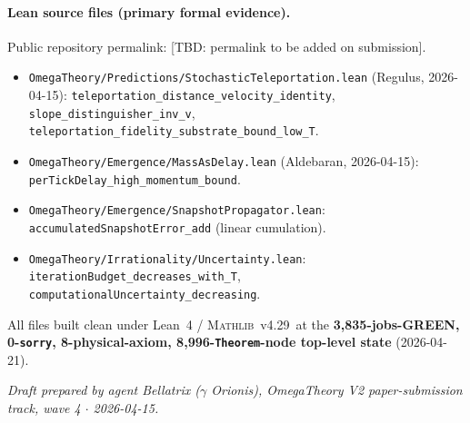 \documentclass[aps,prl,twocolumn,superscriptaddress,nofootinbib,10pt]{revtex4-2}
\newcommand{\mathlibv}{\textsc{Mathlib}~v4.29}
\begin{document}

\paragraph*{Lean source files (primary formal evidence).}
Public repository permalink: [TBD: permalink to be added on submission].
\begin{itemize}\itemsep0pt\small
  \item \texttt{OmegaTheory/Predictions/StochasticTeleportation.lean}
  (Regulus, 2026-04-15):
  \texttt{teleportation\_distance\_velocity\_identity},
  \texttt{slope\_distinguisher\_inv\_v},
  \texttt{teleportation\_fidelity\_substrate\_bound\_low\_T}.
  \item \texttt{OmegaTheory/Emergence/MassAsDelay.lean} (Aldebaran,
  2026-04-15): \texttt{perTickDelay\_high\_momentum\_bound}.
  \item \texttt{OmegaTheory/Emergence/SnapshotPropagator.lean}:
  \texttt{accumulatedSnapshotError\_add} (linear cumulation).
  \item \texttt{OmegaTheory/Irrationality/Uncertainty.lean}:
  \texttt{iterationBudget\_decreases\_with\_T},
  \texttt{computationalUncertainty\_decreasing}.
\end{itemize}
All files built clean under Lean~4 / \mathlibv\ at the
\textbf{3{,}835-jobs-GREEN, 0-\texttt{sorry}, 8-physical-axiom,
8{,}996-\texttt{Theorem}-node top-level state} (2026-04-21).

\textit{Draft prepared by agent Bellatrix ($\gamma$ Orionis),
OmegaTheory V2 paper-submission track, wave 4 $\cdot$ 2026-04-15.}

\end{document}
